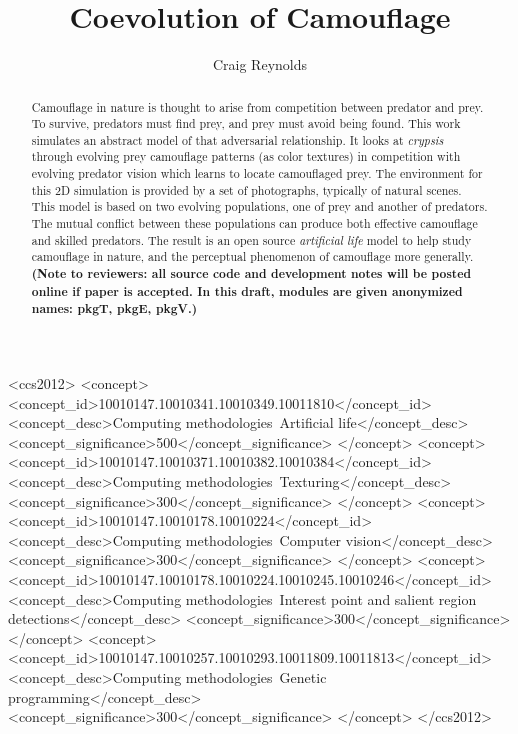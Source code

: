 \documentclass[acmtog,
    anonymous,
    review
    ]{acmart}
\newcommand{\texsyn}[0]{pkgT}
\newcommand{\lazypredator}[0]{pkgE}
\newcommand{\predatoreye}[0]{pkgV}
\begin{document}
\title{Coevolution of Camouflage}

\author{Craig Reynolds}

\renewcommand{\shortauthors}{Craig Reynolds}


\begin{abstract}
    Camouflage in nature is thought to arise from competition between predator and prey. To survive, predators must find prey, and prey must avoid being found. This work simulates an abstract model of that adversarial relationship. It looks at \textit{crypsis} through evolving prey camouflage patterns (as color textures) in competition with evolving predator vision which learns to locate camouflaged prey. The environment for this 2D simulation is provided by a set of photographs, typically of natural scenes. This model is based on two evolving populations, one of prey and another of predators. The mutual conflict between these populations can produce both effective camouflage and skilled predators. The result is an open source \textit{artificial life} model to help study camouflage in nature, and the perceptual phenomenon of camouflage more generally. \textbf{(Note to reviewers: all source code and development notes will be posted online if paper is accepted. In this draft, modules are given anonymized names: \texsyn{}, \lazypredator{}, \predatoreye{}.)}
\end{abstract}


\begin{CCSXML}
<ccs2012>
   <concept>
       <concept_id>10010147.10010341.10010349.10011810</concept_id>
       <concept_desc>Computing methodologies~Artificial life</concept_desc>
       <concept_significance>500</concept_significance>
       </concept>
   <concept>
       <concept_id>10010147.10010371.10010382.10010384</concept_id>
       <concept_desc>Computing methodologies~Texturing</concept_desc>
       <concept_significance>300</concept_significance>
       </concept>
   <concept>
       <concept_id>10010147.10010178.10010224</concept_id>
       <concept_desc>Computing methodologies~Computer vision</concept_desc>
       <concept_significance>300</concept_significance>
       </concept>
    <concept>
       <concept_id>10010147.10010178.10010224.10010245.10010246</concept_id>
       <concept_desc>Computing methodologies~Interest point and salient region detections</concept_desc>
       <concept_significance>300</concept_significance>
       </concept>
    <concept>
        <concept_id>10010147.10010257.10010293.10011809.10011813</concept_id>
        <concept_desc>Computing methodologies~Genetic programming</concept_desc>
        <concept_significance>300</concept_significance>
        </concept>
 </ccs2012>
\end{CCSXML}
\end{document}
